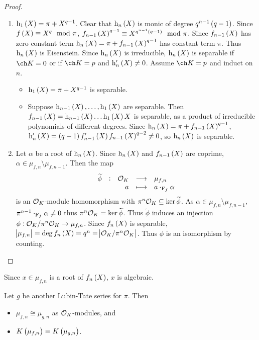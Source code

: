\begin{proof}
\hfill
\begin{enumerate}
\item $ \h_1\br{X} = \pi + X^{q - 1} $. Clear that $ \h_n\br{X} $ is monic of degree $ q^{n - 1}\br{q - 1} $. Since $ f\br{X} \equiv X^q \mod \pi $, $ f_{n - 1}\br{X}^{q - 1} \equiv X^{q^{n - 1}\br{q - 1}} \mod \pi $. Since $ f_{n - 1}\br{X} $ has zero constant term $ \h_n\br{X} = \pi + f_{n - 1}\br{X}^{q - 1} $ has constant term $ \pi $. Thus $ \h_n\br{X} $ is Eisenstein. Since $ \h_n\br{X} $ is irreducible, $ \h_n\br{X} $ is separable if $ \ch K = 0 $ or if $ \ch K = p $ and $ \h_n'\br{X} \ne 0 $. Assume $ \ch K = p $ and induct on $ n $.
\begin{itemize}
\item $ \h_1\br{X} = \pi + X^{q - 1} $ is separable.
\item Suppose $ \h_{n - 1}\br{X}, \dots, \h_1\br{X} $ are separable. Then $ f_{n - 1}\br{X} = \h_{n - 1}\br{X} \dots \h_1\br{X}X $ is separable, as a product of irreducible polynomials of different degrees. Since $ \h_n\br{X} = \pi + f_{n - 1}\br{X}^{q - 1} $, $ \h_n'\br{X} = \br{q - 1}f_{n - 1}'\br{X}f_{n - 1}\br{X}^{q - 2} \ne 0 $, so $ \h_n\br{X} $ is separable.
\end{itemize}
\item Let $ \alpha $ be a root of $ \h_n\br{X} $. Since $ \h_n\br{X} $ and $ f_{n - 1}\br{X} $ are coprime, $ \alpha \in \mu_{f, n} \setminus \mu_{f, n - 1} $. Then the map
$$ \function[\widetilde{\phi}]{\OOO_K}{\mu_{f, n}}{a}{a \cdot_{\F_f} \alpha} $$
is an $ \mathcal{O}_K $-module homomorphism with $ \pi^n\mathcal{O}_K \subseteq \ker \widetilde{\phi} $. As $ \alpha \in \mu_{f, n} \setminus \mu_{f, n - 1} $, $ \pi^{n - 1} \cdot_{\mathrm{F}_f} \alpha \ne 0 $ thus $ \pi^n\mathcal{O}_K = \ker \widetilde{\phi} $. Thus $ \widetilde{\phi} $ induces an injection $ \phi : \mathcal{O}_K / \pi^n\mathcal{O}_K \to \mu_{f, n} $. Since $ f_n\br{X} $ is separable, $ \abs{\mu_{f, n}} = \deg f_n\br{X} = q^n = \abs{\OOO_K / \pi^n\OOO_K} $. Thus $ \phi $ is an isomorphism by counting.
\end{enumerate}
\end{proof}

\pagebreak

Since $ x \in \mu_{f, n} $ is a root of $ f_n\br{X} $, $ x $ is algebraic.

\begin{proposition}
\label{prop:21.4}
Let $ g $ be another Lubin-Tate series for $ \pi $. Then
\begin{itemize}
\item $ \mu_{f, n} \cong \mu_{g, n} $ as $ \mathcal{O}_K $-modules, and
\item $ K\br{\mu_{f, n}} = K\br{\mu_{g, n}} $.
\end{itemize}
\end{proposition}

